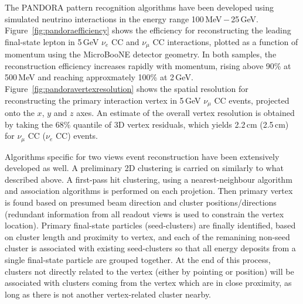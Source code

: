 The PANDORA pattern recognition algorithms have been developed
using simulated neutrino interactions in the energy range 100\,MeV\,$-$\,25\,GeV.
Figure~\ref{fig:pandoraefficiency} shows the efficiency for reconstructing
the leading final-state lepton in 5\,GeV $\nu_{e}$ CC and $\nu_{\mu}$ CC interactions,
plotted as a function of momentum using the MicroBooNE detector geometry.
In both samples, the reconstruction efficiency increases rapidly with momentum,
rising above 90\% at 500\,MeV and reaching approxmately 100\% at 2\,GeV.
Figure~\ref{fig:pandoravertexresolution} shows the spatial resolution for
reconstructing the primary interaction vertex in 5\,GeV $\nu_{\mu}$ CC events,
projected onto the $x$, $y$ and $z$ axes. An estimate of the overall vertex 
resolution is obtained by taking the 68\% quantile of 3D vertex residuals, 
which yields 2.2\,cm (2.5\,cm) for $\nu_{\mu}$ CC ($\nu_{e}$ CC) events.



Algorithms specific for two views event reconstruction have been extensively developed as well. 
A preliminary 2D clustering is carried on similarly to what described above.
A first-pass hit clustering, using a nearest-neighbour algorithm and association algorithms is performed
on each projetion. Then primary vertex is found based on presumed beam direction and cluster positions/directions
(redundant information from all readout views is used to constrain the vertex location).
Primary final-state particles (seed-clusters) are finally identified, based on cluster length and proximity to vertex,
and each of the remanining non-seed cluster is associated with existing seed-clusters so that all energy deposits from a single final-state particle are grouped together.
At the end of this process, clusters not directly related to the vertex (either by pointing or position) 
will be associated with clusters coming from the vertex which are in close proximity, 
as long as there is not another vertex-related cluster nearby. 

